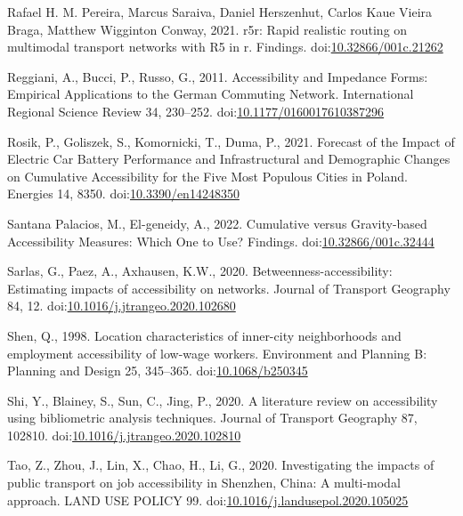 \documentclass[]{elsarticle} %
\newlength{\cslhangindent}
\newlength{\cslentryspacingunit} %
\newenvironment{CSLReferences}[2] %
 {%
  \setlength{\parindent}{0pt}
  \ifodd #1
  \let\oldpar\par
  \def\par{\hangindent=\cslhangindent\oldpar}
  \fi
  \setlength{\parskip}{#2\cslentryspacingunit}
 }%
 {}
\begin{document}
\begin{CSLReferences}{1}{0}
\leavevmode{}%
Rafael H. M. Pereira, Marcus Saraiva, Daniel Herszenhut, Carlos Kaue
Vieira Braga, Matthew Wigginton Conway, 2021. r5r: Rapid realistic
routing on multimodal transport networks with R5 in r. Findings.
doi:\href{https://doi.org/10.32866/001c.21262}{10.32866/001c.21262}

\leavevmode{}%
Reggiani, A., Bucci, P., Russo, G., 2011. Accessibility and {Impedance}
{Forms}: {Empirical} {Applications} to the {German} {Commuting}
{Network}. International Regional Science Review 34, 230--252.
doi:\href{https://doi.org/10.1177/0160017610387296}{10.1177/0160017610387296}

\leavevmode{}%
Rosik, P., Goliszek, S., Komornicki, T., Duma, P., 2021. Forecast of the
{Impact} of {Electric} {Car} {Battery} {Performance} and
{Infrastructural} and {Demographic} {Changes} on {Cumulative}
{Accessibility} for the {Five} {Most} {Populous} {Cities} in {Poland}.
Energies 14, 8350.
doi:\href{https://doi.org/10.3390/en14248350}{10.3390/en14248350}

\leavevmode{}%
Santana Palacios, M., El-geneidy, A., 2022. Cumulative versus
Gravity-based Accessibility Measures: Which One to Use? Findings.
doi:\href{https://doi.org/10.32866/001c.32444}{10.32866/001c.32444}

\leavevmode{}%
Sarlas, G., Paez, A., Axhausen, K.W., 2020. Betweenness-accessibility:
Estimating impacts of accessibility on networks. Journal of Transport
Geography 84, 12.
doi:\href{https://doi.org/10.1016/j.jtrangeo.2020.102680}{10.1016/j.jtrangeo.2020.102680}

\leavevmode{}%
Shen, Q., 1998. Location characteristics of inner-city neighborhoods and
employment accessibility of low-wage workers. Environment and Planning
B: Planning and Design 25, 345--365.
doi:\href{https://doi.org/10.1068/b250345}{10.1068/b250345}

\leavevmode{}%
Shi, Y., Blainey, S., Sun, C., Jing, P., 2020. A literature review on
accessibility using bibliometric analysis techniques. Journal of
Transport Geography 87, 102810.
doi:\href{https://doi.org/10.1016/j.jtrangeo.2020.102810}{10.1016/j.jtrangeo.2020.102810}

\leavevmode{}%
Tao, Z., Zhou, J., Lin, X., Chao, H., Li, G., 2020. Investigating the
impacts of public transport on job accessibility in {Shenzhen}, {China}:
A multi-modal approach. LAND USE POLICY 99.
doi:\href{https://doi.org/10.1016/j.landusepol.2020.105025}{10.1016/j.landusepol.2020.105025}


\end{CSLReferences}
\end{document}
